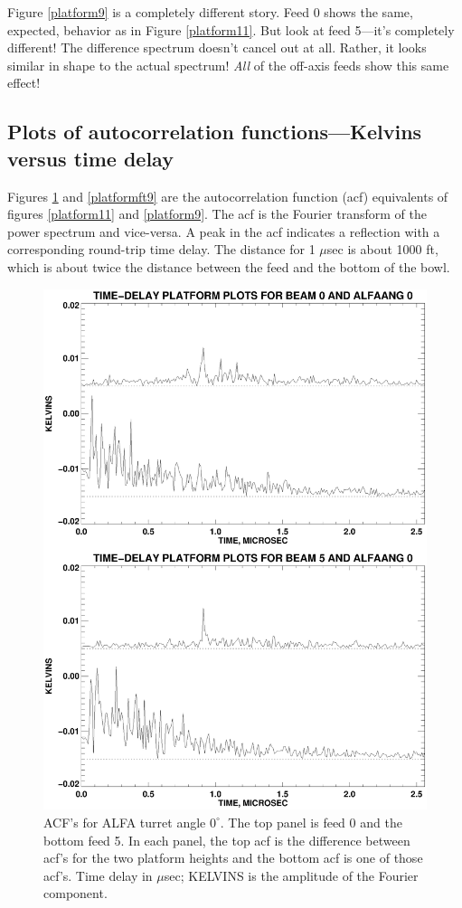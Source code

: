\documentclass[psfig,preprint]{aastex}
\begin{document}
	Figure \ref{platform9} is a completely different story. Feed 0
shows the same, expected, behavior as in Figure \ref{platform11}. But
look at feed 5---it's completely different! The difference spectrum
doesn't cancel out at all. Rather, it looks similar in shape to the
actual spectrum! {\it All} of the off-axis feeds show this same effect!

\subsection{Plots of autocorrelation functions---Kelvins versus time delay}

	Figures \ref{platformft11} and \ref{platformft9} are the
autocorrelation function (acf) equivalents of figures \ref{platform11} and
\ref{platform9}.  The acf is the Fourier transform of the power
spectrum and vice-versa. A peak in the acf indicates a reflection with a
corresponding round-trip time delay. The distance for 1 $\mu$sec is
about 1000 ft, which is about twice the distance between the feed and
the bottom of the bowl. 

\begin{figure}[!p]
\begin{center}
\includegraphics[width=6in]{platform_ft11.ps}   
\end{center}
\caption{ACF's for ALFA turret angle $0^\circ$. 
The top panel is feed 0 and the bottom feed 5. In each panel,
the top acf is the difference between acf's for the two platform heights
and the bottom acf is one of those acf's. Time delay in $\mu$sec;
KELVINS is the amplitude of the Fourier component. \label{platformft11}}
\end{figure}
\end{document}
